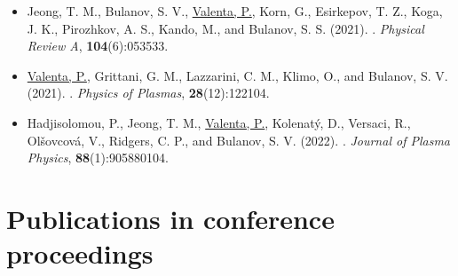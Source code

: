 \documentclass[10pt, a4paper, twoside, openright]{report}
\newcommand{\link}[3][blue]{\href{#2}{\color{#1}{#3}}}%
\begin{document}
\begin{itemize}
	\item Jeong, T. M., Bulanov, S. V., \underline{Valenta, P.}, Korn, G., Esirkepov, T. Z., Koga, J. K., Pirozhkov, A. S., Kando, M., and Bulanov, S. S. (2021). \link{https://doi.org/10.1103/PhysRevA.104.053533}{Relativistic-flying laser focus by a laser-produced parabolic plasma mirror}. \textit{Physical Review A}, \textbf{104}(6):053533.
	
	\item \underline{Valenta, P.}, Grittani, G. M., Lazzarini, C. M., Klimo, O., and Bulanov, S. V. (2021). \link{https://doi.org/10.1063/5.0065167}{On the electromagnetic-electron rings originating from the interaction of high-power short-pulse laser and underdense plasma}. \textit{Physics of Plasmas}, \textbf{28}(12):122104.
	
	\item Hadjisolomou, P., Jeong, T. M., \underline{Valenta, P.}, Kolenatý, D., Versaci, R., Olšovcová, V., Ridgers, C. P., and Bulanov, S. V. (2022). \link{https://doi.org/10.1017/S0022377821001318}{Gamma-ray flash in the interaction of a tightly focused single-cycle ultraintense laser pulse with a solid target}. \textit{Journal of Plasma Physics}, \textbf{88}(1):905880104.
	
\end{itemize}

\section{Publications in conference proceedings\label{sec:conference_proceedings}}
\end{document}
